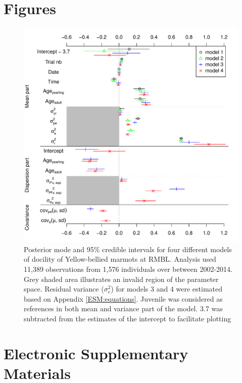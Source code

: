 \documentclass[a4paper,12pt,twoside]{article}
\begin{document}
	\section*{Figures}
	\begin{figure}[ht!]
		\caption{Posterior mode and 95\% credible intervals for four different models of docility of Yellow-bellied marmots at RMBL. 
			Analysis used 11,389 observations from 1,576 individuals over between 2002-2014. 
			Grey shaded area illustrates an invalid region of the parameter space. 
			Residual variance ($\sigma_e^2$) for models 3 and 4 were estimated based on Appendix \ref{ESM:equations}. 
			Juvenile was considered as references in both mean and variance part of the model.
			3.7 was subtracted from the estimates of the intercept to facilitate plotting}
		\label{Fig:yr}
		\begin{center}
			\includegraphics[width=14cm]{Fig1year.pdf}
		\end{center}
	\end{figure}
	
	
	\newpage
	\section*{Electronic Supplementary Materials}
	\setcounter{table}{0}
	\setcounter{figure}{0}
	\renewcommand{\thetable}{S\arabic{table}}
	\renewcommand{\thefigure}{S\arabic{figure}}
	
\end{document}
